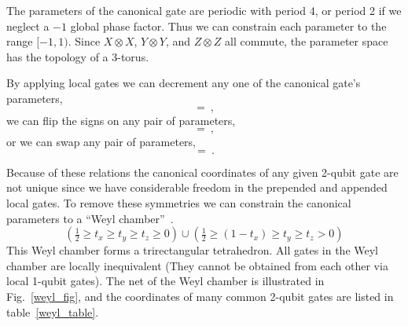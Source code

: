 The parameters of the canonical gate are periodic with period 4, or period 2 if we neglect a $-1$ global phase factor. Thus we can constrain each parameter to the range $[-1,1)$. Since $X\otimes X$,  $Y\otimes Y$, and $Z \otimes Z$ all commute, the parameter space has the topology of a 3-torus.
%


\begin{center}
\end{center}

By applying local gates we can decrement any one of the canonical gate's parameters,
$$

=
 \ ,
$$
we can flip the signs on any pair of parameters,
$$

=
 \ ,
$$
or we can swap any pair of parameters,
$$

= 
 \ .
$$

Because of these relations the canonical coordinates of any given 2-qubit gate are not unique since we have considerable freedom in the prepended and appended local gates. To remove these symmetries we can constrain the canonical parameters to a ``Weyl chamber''~\cite{???,???}. 
\begin{equation}
(\tfrac{1}{2} \ge  t_x \ge t_y \ge t_z \ge 0) \cup (\tfrac{1}{2} \ge (1-t_x) \ge t_y \ge t_z > 0 )
\label{WeylChamber}
\end{equation}
This Weyl chamber forms a  trirectangular tetrahedron.  All gates in the Weyl chamber are locally inequivalent (They cannot be obtained from each other via local 1-qubit gates). The net of the Weyl chamber is illustrated in Fig.~\ref{weyl_fig}, and the coordinates of many common 2-qubit gates are listed in table~\ref{weyl_table}. 

